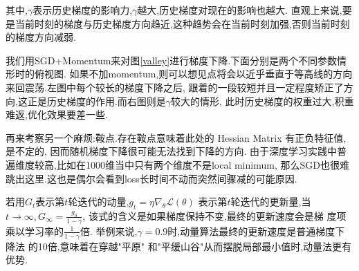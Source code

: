其中,$\gamma$表示历史梯度的影响力,$\gamma$越大,历史梯度对现在的影响也越大.
直观上来说,要是当前时刻的梯度与历史梯度方向趋近,这种趋势会在当前时刻加强,否则当前时刻的梯度方向减弱.

我们用SGD+Momentum来对图\ref{valley}进行梯度下降.下面分别是两个不同参数情形时的俯视图.
如果不加momentum,则可以想见点将会以近乎垂直于等高线的方向来回震荡.左图中每个较长的梯度下降之后,
跟着的一段较短并且一定程度矫正了方向,这正是历史梯度的作用.而右图则是$\gamma$较大的情形,
此时历史梯度的权重过大,积重难返,优化效果要差一些.

\begin{figure}[htbp]
	\centering
\end{figure}

再来考察另一个麻烦:鞍点.存在鞍点意味着此处的 Hessian Matrix 有正负特征值,是不定的,
因而随机梯度下降很可能无法找到下降的方向.
由于深度学习实践中普遍维度较高,比如在1000维当中只有两个维度不是local minimum,
那么SGD也很难跳出这里.这也是偶尔会看到loss长时间不动而突然间骤减的可能原因.

若用$G_{t}$表示第$t$轮迭代的动量,$g_{t}=\eta \nabla_{\theta} \mathcal L(\theta)$
表示第$t$轮迭代的更新量,当$t \rightarrow \infty , G_{\infty}=\frac{g_{0}}{1-\gamma}$,
该式的含义是如果梯度保持不变,最终的更新速度会是梯 度项乘以学习率的$\frac{1}{1-\gamma}$倍.
举例来说,$\gamma=0.9$时,动量算法最终的更新速度是普通梯度下降法 的10倍,意味着在穿越"平原" 
和"平缓山谷"从而摆脱局部最小值时,动量法更有优势.

